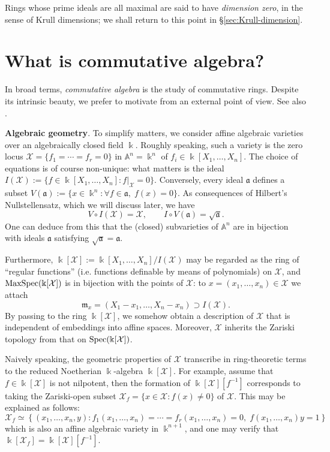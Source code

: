 Rings whose prime ideals are all maximal are said to have \emph{dimension zero}, in the sense of Krull dimensions; we shall return to this point in \S\ref{sec:Krull-dimension}.

\section{What is commutative algebra?}
In broad terms, \emph{commutative algebra} is the study of commutative rings. Despite its intrinsic beauty, we prefer to motivate from an external point of view. See also \cite{Eis95}.

\begin{asparaenum}[(A)]
	\item \textbf{Algebraic geometry}. To simplify matters, we consider affine algebraic varieties over an algebraically closed field $\Bbbk$. Roughly speaking, such a variety is the zero locus $\mathcal{X} = \{ f_1 = \cdots = f_r = 0 \}$ in $\mathbb{A}^n = \Bbbk^n$ of $f_i \in \Bbbk[X_1, \ldots, X_n]$. The choice of equations is of course non-unique: what matters is the ideal $I(\mathcal{X}) := \{ f \in \Bbbk[X_1, \ldots, X_n] : f|_{\mathcal{X}} = 0 \}$. Conversely, every ideal $\mathfrak{a}$ defines a subset $V(\mathfrak{a}) := \{x \in \Bbbk^n : \forall f \in \mathfrak{a}, \; f(x)=0 \}$. As consequences of Hilbert's Nullstellensatz, which we will discuss later, we have
	\[ V \circ I(\mathcal{X}) = \mathcal{X}, \qquad I \circ V(\mathfrak{a})  = \sqrt{\mathfrak{a}}. \]
	One can deduce from this that the (closed) subvarieties of $\mathbb{A}^n$ are in bijection with ideals $\mathfrak{a}$ satisfying $\sqrt{\mathfrak{a}} = \mathfrak{a}$.

	Furthermore, $\Bbbk[\mathcal{X}] := \Bbbk[X_1, \ldots, X_n]/I(\mathcal{X})$ may be regarded as the ring of ``regular functions'' (i.e. functions definable by means of polynomials) on $\mathcal{X}$, and $\operatorname{MaxSpec}(\Bbbk[\mathcal{X}])$ is in bijection with the points of $\mathcal{X}$: to $x = (x_1, \ldots, x_n) \in \mathcal{X}$ we attach
	\[ \mathfrak{m}_x = (X_1 - x_1, \ldots, X_n - x_n) \supset I(\mathcal{X}). \]
	By passing to the ring $\Bbbk[\mathcal{X}]$, we somehow obtain a description of $\mathcal{X}$ that is independent of embeddings into affine spaces. Moreover, $\mathcal{X}$ inherits the Zariski topology from that on $\operatorname{Spec}(\Bbbk[\mathcal{X}])$.

	Naively speaking, the geometric properties of $\mathcal{X}$ transcribe in ring-theoretic terms to the reduced Noetherian $\Bbbk$-algebra $\Bbbk[\mathcal{X}]$. For example, assume that $f \in \Bbbk[\mathcal{X}]$ is not nilpotent, then the formation of $\Bbbk[\mathcal{X}][f^{-1}]$ corresponds to taking the Zariski-open subset $\mathcal{X}_f = \{x \in \mathcal{X}: f(x) \neq 0 \}$ of $\mathcal{X}$. This may be explained as follows:
	\[ \mathcal{X}_f \simeq \left\{ (x_1, \ldots, x_n, y) : f_1(x_1, \ldots, x_n) = \cdots = f_r(x_1, \ldots, x_n) = 0, \; f(x_1, \ldots, x_n)y = 1 \right\} \]
	which is also an affine algebraic variety in $\Bbbk^{n+1}$, and one may verify that $\Bbbk[\mathcal{X}_f] = \Bbbk[\mathcal{X}][f^{-1}]$.


\end{asparaenum}

